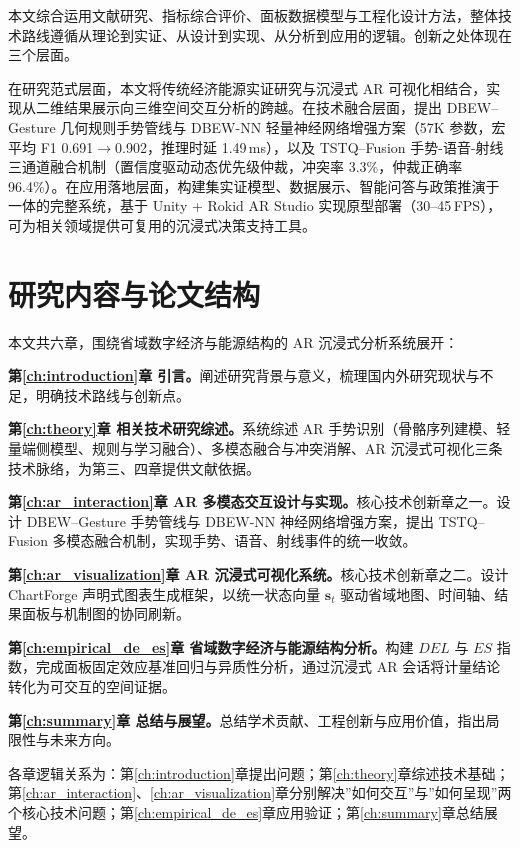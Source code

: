 本文综合运用文献研究、指标综合评价、面板数据模型与工程化设计方法，整体技术路线遵循从理论到实证、从设计到实现、从分析到应用的逻辑。创新之处体现在三个层面。

在研究范式层面，本文将传统经济能源实证研究与沉浸式 AR 可视化相结合，实现从二维结果展示向三维空间交互分析的跨越。在技术融合层面，提出 DBEW--Gesture 几何规则手势管线与 DBEW-NN 轻量神经网络增强方案（57K 参数，宏平均 F1 0.691$\rightarrow$0.902，推理时延 1.49\,ms），以及 TSTQ--Fusion 手势-语音-射线三通道融合机制（置信度驱动动态优先级仲裁，冲突率 3.3\%，仲裁正确率 96.4\%）。在应用落地层面，构建集实证模型、数据展示、智能问答与政策推演于一体的完整系统，基于 Unity + Rokid AR Studio 实现原型部署（30--45\,FPS），可为相关领域提供可复用的沉浸式决策支持工具。

\section{研究内容与论文结构}
\label{sec:research_content}

本文共六章，围绕省域数字经济与能源结构的 AR 沉浸式分析系统展开：

\textbf{第\ref{ch:introduction}章 引言。}阐述研究背景与意义，梳理国内外研究现状与不足，明确技术路线与创新点。

\textbf{第\ref{ch:theory}章 相关技术研究综述。}系统综述 AR 手势识别（骨骼序列建模、轻量端侧模型、规则与学习融合）、多模态融合与冲突消解、AR 沉浸式可视化三条技术脉络，为第三、四章提供文献依据。

\textbf{第\ref{ch:ar_interaction}章 AR 多模态交互设计与实现。}核心技术创新章之一。设计 DBEW--Gesture 手势管线与 DBEW-NN 神经网络增强方案，提出 TSTQ--Fusion 多模态融合机制，实现手势、语音、射线事件的统一收敛。

\textbf{第\ref{ch:ar_visualization}章 AR 沉浸式可视化系统。}核心技术创新章之二。设计 ChartForge 声明式图表生成框架，以统一状态向量 $\mathbf{s}_t$ 驱动省域地图、时间轴、结果面板与机制图的协同刷新。

\textbf{第\ref{ch:empirical_de_es}章 省域数字经济与能源结构分析。}构建 $DEL$ 与 $ES$ 指数，完成面板固定效应基准回归与异质性分析，通过沉浸式 AR 会话将计量结论转化为可交互的空间证据。

\textbf{第\ref{ch:summary}章 总结与展望。}总结学术贡献、工程创新与应用价值，指出局限性与未来方向。

各章逻辑关系为：第\ref{ch:introduction}章提出问题；第\ref{ch:theory}章综述技术基础；第\ref{ch:ar_interaction}、\ref{ch:ar_visualization}章分别解决”如何交互”与”如何呈现”两个核心技术问题；第\ref{ch:empirical_de_es}章应用验证；第\ref{ch:summary}章总结展望。

